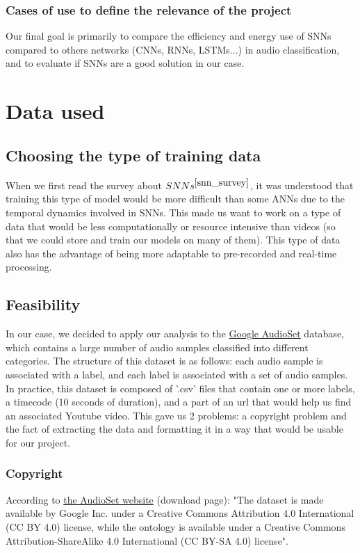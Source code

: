 \documentclass[11pt]{article}
\begin{document}
\subsubsection{Cases of use to define the relevance of the project}
Our final goal is primarily to compare the efficiency and energy use of SNNs compared to others networks (CNNs, RNNs, LSTMs...) in audio classification, and to evaluate if SNNs are a good solution in our case.


\section{Data used}
\subsection{Choosing the type of training data}

When we first read the survey about $SNNs^{\cite{snn_survey}}$, it was understood that training this type of model would be more difficult than some ANNs due to the temporal dynamics involved in SNNs. This made us want to work on a type of data that would be less computationally or resource intensive than videos (so that we could store and train our models on many of them). This type of data also has the advantage of being more adaptable to pre-recorded and real-time processing.
\subsection{Feasibility}

In our case, we decided to apply our analysis to the \hyperref[item:google-audioset]{Google AudioSet} database, which contains a large number of audio samples classified into different categories.
The structure of this dataset is as follows: each audio sample is associated with a label, and each label is associated with a set of audio samples. In practice, this dataset is composed of '.csv' files that contain one or more labels, a timecode (10 seconds of duration), and a part of an url that would help us find an associated Youtube video. This gave us 2 problems: a copyright problem and the fact of extracting the data and formatting it in a way that would be usable for our project.

\subsubsection{Copyright}

According to \hyperref[item:google-audioset]{the AudioSet website} (download page): "The dataset is made available by Google Inc. under a Creative Commons Attribution 4.0 International (CC BY 4.0) license, while the ontology is available under a Creative Commons Attribution-ShareAlike 4.0 International (CC BY-SA 4.0) license".
\end{document}
